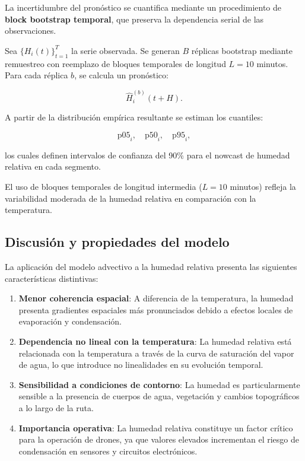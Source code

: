 \documentclass[
  spanish,
  us-letterpaper,
]{scrreprt}
\numberwithin{equation}{section}
\begin{document}
La incertidumbre del pronóstico se cuantifica mediante un procedimiento
de \textbf{block bootstrap temporal}, que preserva la dependencia serial
de las observaciones.

Sea \(\{H_i(t)\}_{t=1}^T\) la serie observada. Se generan \(B\) réplicas
bootstrap mediante remuestreo con reemplazo de bloques temporales de
longitud \(L = 10\) minutos. Para cada réplica \(b\), se calcula un
pronóstico:

\[
\hat{H}_i^{(b)}(t+H).
\]

A partir de la distribución empírica resultante se estiman los
cuantiles:

\[
\text{p05}_i, \quad \text{p50}_i, \quad \text{p95}_i,
\]

los cuales definen intervalos de confianza del 90\% para el nowcast de
humedad relativa en cada segmento.

El uso de bloques temporales de longitud intermedia (\(L = 10\) minutos)
refleja la variabilidad moderada de la humedad relativa en comparación
con la temperatura.

\subsection{Discusión y propiedades del
modelo}\label{discusiuxf3n-y-propiedades-del-modelo-1}

La aplicación del modelo advectivo a la humedad relativa presenta las
siguientes características distintivas:

\begin{enumerate}
\def\labelenumi{\arabic{enumi}.}
\item
  \textbf{Menor coherencia espacial}: A diferencia de la temperatura, la
  humedad presenta gradientes espaciales más pronunciados debido a
  efectos locales de evaporación y condensación.
\item
  \textbf{Dependencia no lineal con la temperatura}: La humedad relativa
  está relacionada con la temperatura a través de la curva de saturación
  del vapor de agua, lo que introduce no linealidades en su evolución
  temporal.
\item
  \textbf{Sensibilidad a condiciones de contorno}: La humedad es
  particularmente sensible a la presencia de cuerpos de agua, vegetación
  y cambios topográficos a lo largo de la ruta.
\item
  \textbf{Importancia operativa}: La humedad relativa constituye un
  factor crítico para la operación de drones, ya que valores elevados
  incrementan el riesgo de condensación en sensores y circuitos
  electrónicos.
\end{enumerate}
\end{document}
